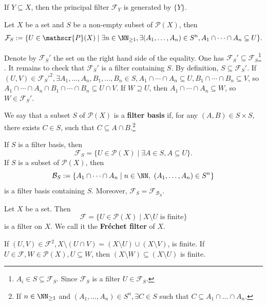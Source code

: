 \begin{remark}
    If $Y\subseteq X$, then the principal filter $\mathcal{ F}_Y$ is generated by $\{Y\}$.
\end{remark}
\begin{propositionenv}
    Let $X$ be a set and $S$ be a non-empty subset of  $\mathscr{P}(X)$, then 
    $$\mathcal{F}_S:=\{U\in \mathscr{P}(X)\mid \exists n\in \NN_{\ge 1}, \exists(A_1,\dots,A_n)\in S^n, A_1\cap\cdots\cap A_n\subseteq U\}.$$
\end{propositionenv}
\begin{proofenv}
    Denote by $\mathcal{F}_S'$ the set on the right hand side of the equality. One has $\mathcal{F}_S'\subseteq \mathcal{F}_S$\footnote{$A_i\in S\subseteq\mathcal{F}_S$. Since $\mathcal{F}_S$ is a filter $U\in \mathcal{F}_S$.} . It remains to check that $\mathcal{F}_S'$ is a filter containing $S$. By definition, $S\subseteq \mathcal{F}_S'$. If $(U,V)\in \mathcal{ F}_S'^2, \exists A_1,\dots,A_n,B_1,\dots,B_n\in S, A_1\cap\cdots\cap A_n\subseteq U, B_1\cap\cdots\cap B_n\subseteq V$, so $A_1\cap\cdots\cap A_n\cap B_1\cap\cdots\cap B_n\subseteq U\cap V$. If $W\supseteq U$, then $A_1\cap\cdots\cap A_n\subseteq W$, so $W\in \mathcal{F}_S'$.
\end{proofenv}
\begin{definitionenv}
    We say that a subset $S$ of $\mathscr{P}(X)$ is a \textbf{filter basis} if, for any $(A,B)\in S\times S$, there exists $C\in S$, such that $C\subseteq A\cap B$.\footnote{If $n\in \NN_{\ge 1}$ and $(A_1,\dots,A_n)\in S^n,\exists C\in S$ such that $C\subseteq A_1\cap \dots\cap A_n$.}
\end{definitionenv}
\begin{remark}
    If $S$ is a filter basis, then 
    $$\mathcal{F}_S=\{U\in \mathscr{P}(X)\mid \exists A\in S, A\subseteq U\}.$$
    If $S$ is a subset of $\mathscr{P}(X)$, then 
    $$\mathcal{B}_S:=\{A_1\cap \cdots \cap A_n\mid n\in \NN,\ (A_1,\dots,A_n)\in S^n\}$$
     is a filter basis containing $S$. Moreover, $\mathcal{F}_S=\mathcal{F}_{\mathcal{B}_S}$.
\end{remark}
\begin{propositionenv}
    Let $X$ be a set. Then
    $$\mathcal{F}=\{U\in \mathscr{P}(X)\mid X\setminus U \text{ is finite}\}$$
    is a filter on $X$. We call it the \textbf{Fréchet filter} of $X$.
\end{propositionenv}
\begin{proofenv}
    \quad
    \newline
    If $(U,V)\in \mathcal{F}^2, X\setminus (U\cap V)=(X\setminus U)\cup (X\setminus V)$, is finite.
    \newline
    If $U\in \mathcal{F}, W\in \mathscr{P}(X), U\subseteq W$, then $(X\setminus W)\subseteq (X\setminus U)$ is finite.
\end{proofenv}
